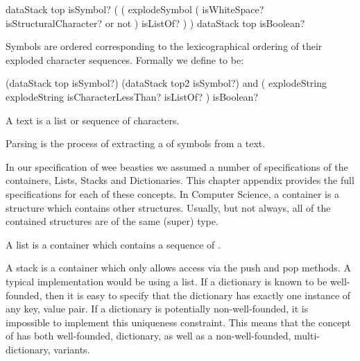\starttyping
{ dataStack top isSymbol? }
(
  ( 
    explodeSymbol
    ( isWhiteSpace? isStructuralCharacter?  or not )
    isListOf?
  )
)
{ dataStack top isBoolean? }
\stoptyping


Symbols are ordered corresponding to the lexicographical ordering of their 
exploded character sequences. Formally we define 
 to be: 

\starttyping
{
  (dataStack top isSymbol?)
  (dataStack top2 isSymbol?)
  and
}
( explodeString explodeString isCharacterLessThan? isListOf?
)
{ isBoolean? }
\stoptyping


\stopDefinition

\subChapterAppendix[title=Texts, reference=textSpec]

A text is a list or sequence of characters.

\subChapterAppendix[title=Parsing, reference=parsingSpec]

Parsing is the process of extracting a  of symbols from 
a text. 

\chapterAppendix[title=Containers]

In our specification of wee beasties we assumed a number of specifications 
of the containers, Lists, Stacks and Dictionaries. This chapter appendix 
provides the full specifications for each of these concepts. In Computer 
Science, a container is a structure which contains other structures. 
Usually, but not always, all of the contained structures are of the same 
(super) type. 

\subChapterAppendix[title=Lists, reference=listSpec]

A list is a container which contains a sequence of \lols.

\subChapterAppendix[title=Stacks, reference=stackSpec]

A stack is a container which only allows access via the push and pop 
methods. A typical implementation would be using a list. If a dictionary 
is known to be well-founded, then it is easy to specify that the 
dictionary has exactly one instance of any key, value pair. If a 
dictionary is potentially non-well-founded, it is impossible to implement 
this uniqueness constraint. This means that the concept of 
 has both well-founded, dictionary, as well as a 
non-well-founded, multi-dictionary, variants. 

